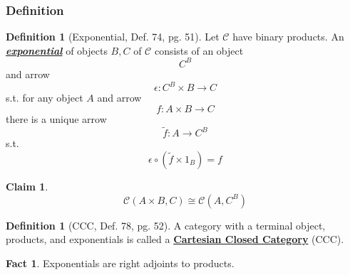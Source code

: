 \documentclass[11pt]{article} %
\newtheorem{claim}[theorem]{Claim}
\theoremstyle{definition}
\newtheorem{definition}[theorem]{Definition}
\theoremstyle{definition}
\newtheorem{fact}[theorem]{Fact}
\theoremstyle{definition}
\begin{document}
\subsubsection{Definition}
\begin{definition}[Exponential, Def. 74, pg. 51]
Let $\mathcal{C}$ have binary products.
An \textbf{\textit{\underline{exponential}}} of objects $B,C$ of $\mathcal{C}$ consists of an object
\[C^B\]
and arrow
\[\epsilon:C^B \times B\rightarrow C\]
s.t. for any object $A$ and arrow
\[f:A\times B\rightarrow C\]
there is a unique arrow
\[\tilde{f}:A\rightarrow C^B\]
s.t.
\[\epsilon \circ (\tilde{f}\times 1_B) = f\]
\end{definition}
\begin{claim}
    \[\mathcal{C}(A\times B, C) \cong \mathcal{C}(A,C^B)\]
\end{claim}
\begin{definition}[CCC, Def. 78, pg. 52]
    A category with a terminal object, products, and exponentials is called a
    \textbf{\underline{Cartesian Closed Category}} (CCC).
\end{definition}
\begin{fact}
    Exponentials are right adjoints to products.
\end{fact}
\end{document}
